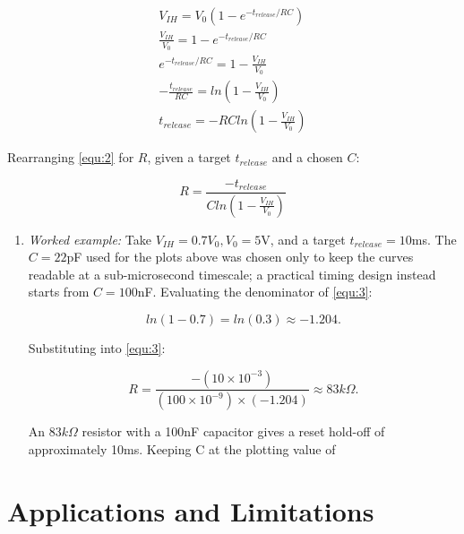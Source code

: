 \documentclass[conference]{IEEEtran}
\begin{document}
\begin{equation}
    \begin{split}
    V_{IH} = V_0(1-e^{-t_{release}/RC})\\
    \frac{V_{IH}}{V_0} = 1-e^{-t_{release}/RC}\\
    e^{-t_{release}/RC} = 1-\frac{V_{IH}}{V_0}\\
    -\frac{t_{release}}{RC} = ln(1-\frac{V_{IH}}{V_0})\\
    t_{release} = -RCln(1-\frac{V_{IH}}{V_0})
    \label{equ:2}
    \end{split}
\end{equation}

Rearranging \ref{equ:2} for $R$, given a target $t_{release}$ and a chosen $C$:

\begin{equation}
    R = \frac{-t_{release}}{Cln(1-\frac{V_{IH}}{V_0})}
    \label{equ:3}
\end{equation}

\begin{enumerate}
    \item\textit{Worked example:} Take $V_{IH}=0.7V_0, V_0=5$V, and a target $t_{release}=10$ms. The $C = 22$pF used for the plots above was chosen only to keep the curves readable at a sub-microsecond timescale; a practical timing design instead starts from $C=100$nF. Evaluating the denominator of \ref{equ:3}:
    
    \begin{equation}
        ln(1-0.7) = ln(0.3)\approx-1.204.
    \end{equation}
    
    Substituting into \ref{equ:3}:

    \begin{equation}
        R = \frac{-(10\times10^{-3})}{(100\times10^{-9})\times(-1.204)}\approx83k\Omega.
    \end{equation}

    An $83k\Omega$ resistor with a 100nF capacitor gives a reset hold-off of approximately 10ms. Keeping C at the plotting value of
\end{enumerate}

\section{Applications and Limitations}
\end{document}
